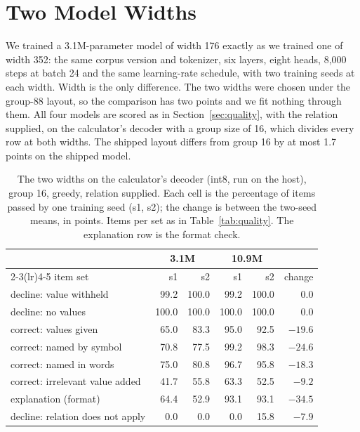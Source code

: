 \documentclass[10pt]{article}
\begin{document}
\section{Two Model Widths}
\label{app:ladder}

We trained a 3.1M-parameter model of width 176 exactly as we trained one of width 352: the same
corpus version and tokenizer, six layers, eight heads, 8,000 steps at batch 24 and the same
learning-rate schedule, with two training seeds at each width. Width is the only difference. The
two widths were chosen under the group-88 layout, so the comparison has two points and we fit
nothing through them. All four models are scored as in Section~\ref{sec:quality}, with the relation
supplied, on the calculator's decoder with a group size of 16, which divides every row at both
widths. The shipped layout differs from group 16 by at most 1.7 points on the shipped model.

\begin{table}[t]
\caption{The two widths on the calculator's decoder (int8, run on the host), group 16, greedy,
relation supplied. Each cell is the percentage of items passed by one training seed (s1, s2); the
change is between the two-seed means, in points. Items per set as in Table~\ref{tab:quality}. The
explanation row is the format check.}
\label{tab:ladder}
\centering\small
\setlength{\tabcolsep}{5pt}
\begin{tabular}{@{}lrrrrr@{}}
\toprule
 & \multicolumn{2}{c}{3.1M} & \multicolumn{2}{c}{10.9M} & \\
\cmidrule(lr){2-3}\cmidrule(lr){4-5}
item set & s1 & s2 & s1 & s2 & change \\
\midrule
decline: value withheld & 99.2 & 100.0 & 99.2 & 100.0 & 0.0 \\
decline: no values & 100.0 & 100.0 & 100.0 & 100.0 & 0.0 \\
correct: values given & 65.0 & 83.3 & 95.0 & 92.5 & $-19.6$ \\
correct: named by symbol & 70.8 & 77.5 & 99.2 & 98.3 & $-24.6$ \\
correct: named in words & 75.0 & 80.8 & 96.7 & 95.8 & $-18.3$ \\
correct: irrelevant value added & 41.7 & 55.8 & 63.3 & 52.5 & $-9.2$ \\
explanation (format) & 64.4 & 52.9 & 93.1 & 93.1 & $-34.5$ \\
decline: relation does not apply & 0.0 & 0.0 & 0.0 & 15.8 & $-7.9$ \\
\bottomrule
\end{tabular}
\end{table}
\end{document}
